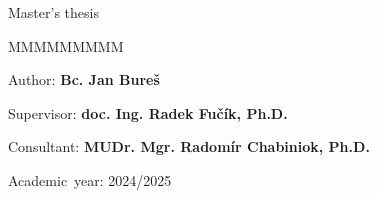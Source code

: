 {%
\vspace{2cm}

{\large{}Master's thesis}{\large\par}
\vfill{}

\begin{lyxlist}{MMMMMMMMM}
	\begin{singlespace}
		\item [{Author:}] \textbf{Bc. Jan Bureš}
		\item [{Supervisor:}] \textbf{doc. Ing. Radek Fučík, Ph.D.}
		\item [{Consultant:}] \textbf{MUDr. Mgr. Radomír Chabiniok, Ph.D.}
		\item [{Academic~year:}] 2024/2025
	\end{singlespace}
\end{lyxlist}
\newpage{}
}



~\newpage{}

